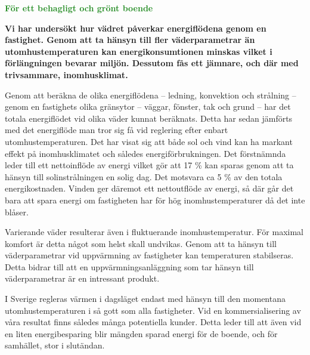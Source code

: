 \documentclass[11pt,a4paper]{article}
\begin{document}
\addtolength{\parindent}{-0.6 cm}
\pagestyle{fancy}
\rhead{\sc\footnotesize \today}
\mbox{}

\begin{center}
\textcolor{ForestGreen}{\textbf{\Huge För ett behagligt och grönt boende}}
\end{center}

\mbox{}

\setlength{\columnsep}{5mm}
\begin{multicols}{2}
\addtolength{\parskip}{1.2ex}
\linespread{1.02}
\normalsize



\textbf{Vi har undersökt hur vädret påverkar energiflödena genom en fastighet. Genom att ta hänsyn till fler väderparametrar än utomhustemperaturen kan energikonsumtionen minskas vilket i förlängningen bevarar miljön. Dessutom fås ett jämnare, och där med trivsammare, inomhusklimat.}

Genom att beräkna de olika energiflödena – ledning, konvektion och strålning – genom en fastighets olika gränsytor – väggar, fönster, tak och grund – har det totala energiflödet vid olika väder kunnat beräknats. Detta har sedan jämförts med det energiflöde man tror sig få vid reglering efter enbart utomhustemperaturen. 
Det har visat sig att både sol och vind kan
ha markant effekt på inomhusklimatet och således energiförbrukningen. Det 
förstnämnda leder till ett nettoinflöde av energi vilket gör att 17 \%
kan sparas genom att ta hänsyn till solinstrålningen en solig dag. Det motsvara ca 5 \% av den totala energikostnaden. Vinden
ger däremot ett nettoutflöde av energi, så där går det bara att spara energi
om fastigheten har för hög inomhus\-temperaturer då det inte blåser.

Varierande väder resulterar även i fluktuerande inomhustemperatur. För maximal komfort är detta något som helst skall undvikas. Genom att ta hänsyn till väderparametrar vid uppvärmning av fastigheter kan temperaturen stabilseras. Detta bidrar till att en uppvärmningsanläggning som tar hänsyn till väderparametrar är en intressant produkt.

I Sverige regleras värmen i dagsläget endast med hänsyn till den momentana utomhustemperaturen i så gott som alla fastigheter. Vid en kommersialisering av våra
resultat finns således många potentiella kunder. Detta leder till att även vid en liten
energibesparing blir mängden sparad energi för de boende, och för samhället,
stor i slutändan.


\end{multicols}
\end{document}
